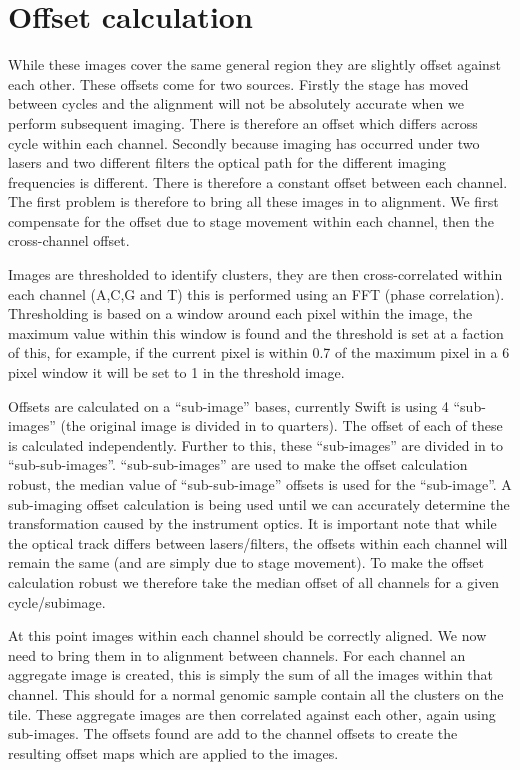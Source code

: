 \documentclass{report}
\begin{document}
\section{Offset calculation}

While these images cover the same general region they are slightly offset against each other. These offsets come for two sources. Firstly the stage has moved between cycles and the alignment will not be absolutely accurate when we perform subsequent imaging. There is therefore an offset which differs across cycle within each channel. Secondly because imaging has occurred under two lasers and two different filters the optical path for the different imaging frequencies is different. There is therefore a constant offset between each channel.
The first problem is therefore to bring all these images in to alignment. We first compensate for the offset due to stage movement within each channel, then the cross-channel offset.

Images are thresholded to identify clusters, they are then cross-correlated within each channel (A,C,G and T) this is performed using an FFT (phase correlation). Thresholding is based on a window around each pixel within the image, the maximum value within this window is found and the threshold is set at a faction of this, for example, if the current pixel is within 0.7 of the maximum pixel in a 6 pixel window it will be set to 1 in the threshold image.

Offsets are calculated on a ``sub-image'' bases, currently Swift is using 4 ``sub-images'' (the original image is divided in to quarters). The offset of each of these is calculated independently. Further to this, these ``sub-images'' are divided in to ``sub-sub-images''. ``sub-sub-images'' are used to make the offset calculation robust, the median value of ``sub-sub-image'' offsets is used for the ``sub-image''. A sub-imaging offset calculation is being used until we can accurately determine the transformation caused by the instrument optics. It is important note that while the optical track differs between lasers/filters, the offsets within each channel will remain the same (and are simply due to stage movement). To make the offset calculation robust we therefore take the median offset of all channels for a given cycle/subimage.

At this point images within each channel should be correctly aligned. We now need to bring them in to alignment between channels. For each channel an aggregate image is created, this is simply the sum of all the images within that channel. This should for a normal genomic sample contain all the clusters on the tile. These aggregate images are then correlated against each other, again using sub-images. The offsets found are add to the channel offsets to create the resulting offset maps which are applied to the images.
\end{document}
